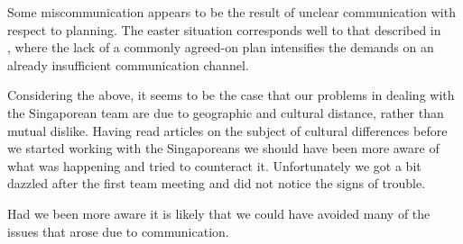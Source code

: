 Some miscommunication appears to be the result of unclear communication with
respect to planning. The easter situation corresponds well to that described in
\\ \cite[sec.~3.1.2]{herbsiemens}, where the lack of a commonly agreed-on plan
intensifies the demands on an already insufficient communication channel.

Considering the above, it seems to be the case that our problems in dealing
with the Singaporean team are due to geographic and cultural distance, rather
than mutual dislike. Having read articles on the subject of cultural
differences before we started working with the Singaporeans we should have been
more aware of what was happening and tried to counteract it. Unfortunately we
got a bit dazzled after the first team meeting and did not notice the signs of
trouble. 

Had we been more aware it is likely that we could have avoided many of the
 issues that arose due to communication.
